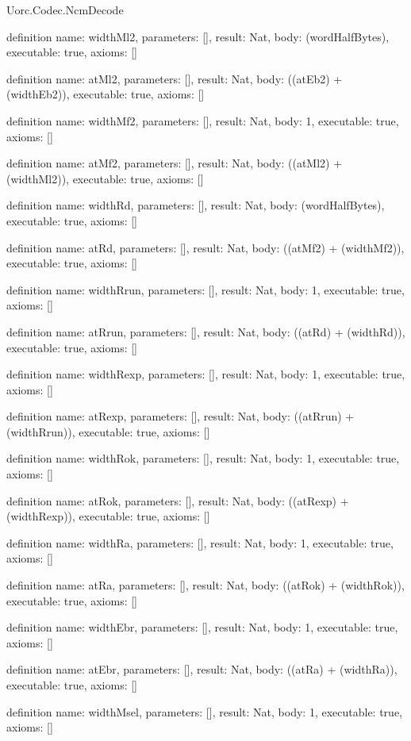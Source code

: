 \begin{lexlean}{Uorc.Codec.NcmDecode}
\begin{semanticmodule}
definition{
  name: widthMl2,
  parameters: [],
  result: Nat,
  body: (wordHalfBytes),
  executable: true,
  axioms: []
}

definition{
  name: atMl2,
  parameters: [],
  result: Nat,
  body: ((atEb2) + (widthEb2)),
  executable: true,
  axioms: []
}

definition{
  name: widthMf2,
  parameters: [],
  result: Nat,
  body: 1,
  executable: true,
  axioms: []
}

definition{
  name: atMf2,
  parameters: [],
  result: Nat,
  body: ((atMl2) + (widthMl2)),
  executable: true,
  axioms: []
}

definition{
  name: widthRd,
  parameters: [],
  result: Nat,
  body: (wordHalfBytes),
  executable: true,
  axioms: []
}

definition{
  name: atRd,
  parameters: [],
  result: Nat,
  body: ((atMf2) + (widthMf2)),
  executable: true,
  axioms: []
}

definition{
  name: widthRrun,
  parameters: [],
  result: Nat,
  body: 1,
  executable: true,
  axioms: []
}

definition{
  name: atRrun,
  parameters: [],
  result: Nat,
  body: ((atRd) + (widthRd)),
  executable: true,
  axioms: []
}

definition{
  name: widthRexp,
  parameters: [],
  result: Nat,
  body: 1,
  executable: true,
  axioms: []
}

definition{
  name: atRexp,
  parameters: [],
  result: Nat,
  body: ((atRrun) + (widthRrun)),
  executable: true,
  axioms: []
}

definition{
  name: widthRok,
  parameters: [],
  result: Nat,
  body: 1,
  executable: true,
  axioms: []
}

definition{
  name: atRok,
  parameters: [],
  result: Nat,
  body: ((atRexp) + (widthRexp)),
  executable: true,
  axioms: []
}

definition{
  name: widthRa,
  parameters: [],
  result: Nat,
  body: 1,
  executable: true,
  axioms: []
}

definition{
  name: atRa,
  parameters: [],
  result: Nat,
  body: ((atRok) + (widthRok)),
  executable: true,
  axioms: []
}

definition{
  name: widthEbr,
  parameters: [],
  result: Nat,
  body: 1,
  executable: true,
  axioms: []
}

definition{
  name: atEbr,
  parameters: [],
  result: Nat,
  body: ((atRa) + (widthRa)),
  executable: true,
  axioms: []
}

definition{
  name: widthMsel,
  parameters: [],
  result: Nat,
  body: 1,
  executable: true,
  axioms: []
}


\end{semanticmodule}
\end{lexlean}
